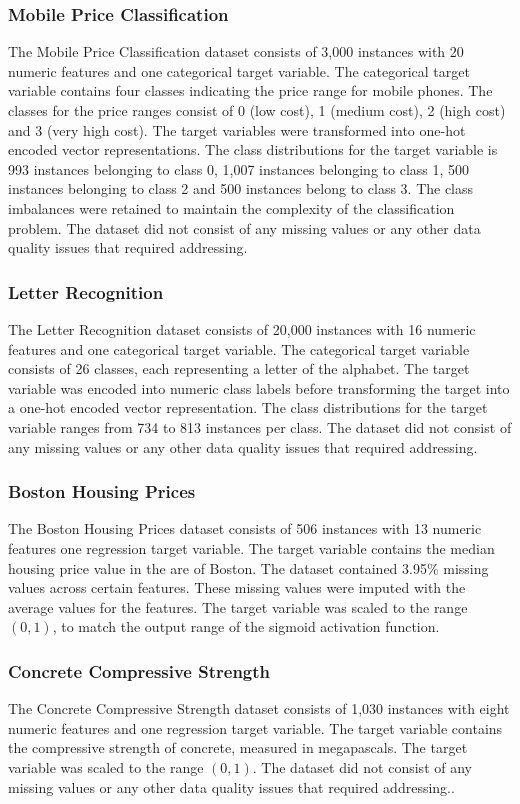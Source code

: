 \documentclass[conference]{IEEEtran}
\begin{document}
	\subsubsection{Mobile Price Classification}
	The Mobile Price Classification dataset consists of 3,000 instances with 20 numeric features and one categorical target variable. The categorical target variable
	contains four classes indicating the price range for mobile phones. The classes for the price ranges consist of 0 (low cost), 1 (medium cost), 2 (high cost) and 3 (very high cost). The target variables were transformed into one-hot encoded vector representations. The class distributions for the target variable is 993 instances belonging to class 0, 1,007 instances belonging to class 1, 500 instances belonging to class 2 and 500 instances belong to class 3. The class imbalances were retained to maintain the complexity of the classification problem. The dataset did not consist of any missing values or any other data quality issues that required addressing.
	
	\subsubsection{Letter Recognition}
	The Letter Recognition dataset consists of 20,000 instances with 16 numeric features and one categorical target variable. The categorical target variable consists of 26 classes, each representing a letter of the alphabet. The target variable was encoded into numeric class labels before transforming the target into a one-hot encoded vector representation. The class distributions for the target variable ranges from 734 to 813 instances per class. The dataset did not consist of any missing values or any other data quality issues that required addressing.
	
	\subsubsection{Boston Housing Prices}
	The Boston Housing Prices dataset consists of 506 instances with 13 numeric features one regression target variable. The target variable contains the median housing price value in the are of Boston. The dataset contained 3.95\% missing values across certain features. These missing values were imputed with the average values for the features. The target variable was scaled to the range $(0, 1)$, to match the output range of the sigmoid activation function.
	
	\subsubsection{Concrete Compressive Strength}
	The Concrete Compressive Strength dataset consists of 1,030 instances with eight numeric features and one regression target variable. The target variable contains the compressive strength of concrete, measured in megapascals. The target variable was scaled to the range $(0, 1)$. The dataset did not consist of any missing values or any other data quality issues that required addressing..
	
\end{document}

